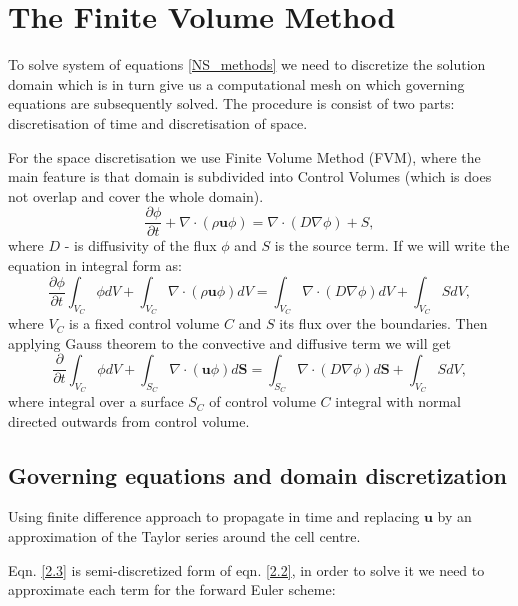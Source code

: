 \section{The Finite Volume Method}
To solve system of equations \ref{NS_methods} we need to discretize the solution domain which is in turn give us a computational mesh on which governing equations are subsequently solved. The procedure is consist of two parts: discretisation of time and discretisation of space.

For the space discretisation we use Finite Volume Method (FVM), where the main feature is that domain is subdivided into Control Volumes (which is does not overlap and cover the whole domain).
\begin{equation}\label{2.2}
\frac{\partial\phi}{\partial t} +\nabla \cdot(\rho\mathbf{u}\phi) = \nabla \cdot(D \nabla \phi) + S ,
\end{equation}
where $D$ -  is diffusivity of the flux $\phi$ and $S$ is the source term. If we will write the equation in integral form as:
\begin{equation}
\frac{\partial\phi}{\partial t}  \int_{V_C} \phi d V+\int_{V_C} \nabla \cdot(\rho\mathbf{u}\phi) d V = \int_{V_C} \nabla \cdot(D \nabla \phi) d V + \int_{V_C} S d V,
\end{equation}
where $V_C$ is a fixed control volume $C$ and $S$ its flux over the boundaries. Then applying Gauss theorem to the convective and diffusive term we will get
\begin{equation}\label{2.3}
\frac{\partial}{\partial t}\int_{V_C} \phi d V+\int_{S_C} \nabla \cdot(\mathbf{u}\phi) d \mathbf{S} = \int_{S_C} \nabla \cdot(D \nabla \phi) d \mathbf{S} + \int_{V_C} S d V,
\end{equation}
where integral over a surface $S_C$ of control volume $C$ integral with normal directed outwards from control volume.

\subsection{Governing equations and domain discretization}
Using finite difference approach to propagate in time and replacing $\mathbf{u}$ by an approximation of the Taylor series around the cell centre.

Eqn. \ref{2.3} is semi-discretized form of eqn. \ref{2.2}, in order to solve it we need to approximate each term \cite{ferziger2002cfd} for the forward Euler scheme:

